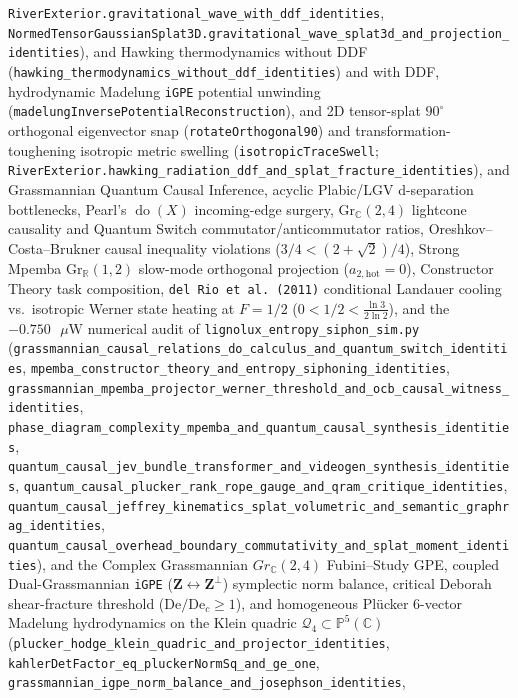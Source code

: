 \texttt{RiverExterior.gravitational\_wave\_with\_ddf\_identities},
\texttt{NormedTensorGaussianSplat3D.gravitational\_wave\_splat3d\_and\_projection\_identities}),
and Hawking thermodynamics without DDF (\texttt{hawking\_thermodynamics\_without\_ddf\_identities})
and with DDF, hydrodynamic Madelung \texttt{iGPE} potential unwinding
(\texttt{madelungInversePotentialReconstruction}), and 2D tensor-splat $90^\circ$
orthogonal eigenvector snap (\texttt{rotateOrthogonal90}) and transformation-toughening
isotropic metric swelling (\texttt{isotropicTraceSwell};
\texttt{RiverExterior.hawking\_radiation\_ddf\_and\_splat\_fracture\_identities}),
and Grassmannian Quantum Causal Inference, acyclic Plabic/LGV d-separation
bottlenecks, Pearl's $\operatorname{do}(X)$ incoming-edge surgery,
$\mathrm{Gr}_{\mathbb{C}}(2,4)$ lightcone causality and Quantum Switch
commutator/anticommutator ratios, Oreshkov--Costa--Brukner causal inequality
violations ($3/4 < (2+\sqrt{2})/4$), Strong Mpemba $\mathrm{Gr}_{\mathbb{R}}(1,2)$
slow-mode orthogonal projection ($a_{2,\mathrm{hot}}=0$), Constructor Theory
task composition, \texttt{del Rio et al.\ (2011)} conditional Landauer cooling vs.\
isotropic Werner state heating at $F=1/2$ ($0 < 1/2 < \frac{\ln 3}{2\ln 2}$), and the
$-0.750\text{ }\mu\text{W}$ numerical audit of \texttt{lignolux\_entropy\_siphon\_sim.py}
(\texttt{grassmannian\_causal\_relations\_do\_calculus\_and\_quantum\_switch\_identities},
\texttt{mpemba\_constructor\_theory\_and\_entropy\_siphoning\_identities},
\texttt{grassmannian\_mpemba\_projector\_werner\_threshold\_and\_ocb\_causal\_witness\_identities},
\texttt{phase\_diagram\_complexity\_mpemba\_and\_quantum\_causal\_synthesis\_identities},
\texttt{quantum\_causal\_jev\_bundle\_transformer\_and\_videogen\_synthesis\_identities},
\texttt{quantum\_causal\_plucker\_rank\_rope\_gauge\_and\_qram\_critique\_identities},
\texttt{quantum\_causal\_jeffrey\_kinematics\_splat\_volumetric\_and\_semantic\_graphrag\_identities},
\texttt{quantum\_causal\_overhead\_boundary\_commutativity\_and\_splat\_moment\_identities}),
and the Complex Grassmannian $Gr_{\mathbb C}(2,4)$ Fubini--Study GPE, coupled
Dual-Grassmannian \texttt{iGPE} ($\mathbf Z \leftrightarrow \mathbf Z^\perp$)
symplectic norm balance, critical Deborah shear-fracture threshold
($\mathrm{De}/\mathrm{De}_c \ge 1$), and homogeneous Plücker 6-vector Madelung
hydrodynamics on the Klein quadric $\mathcal Q_4 \subset \mathbb P^5(\mathbb C)$
(\texttt{plucker\_hodge\_klein\_quadric\_and\_projector\_identities},
\texttt{kahlerDetFactor\_eq\_pluckerNormSq\_and\_ge\_one},
\texttt{grassmannian\_igpe\_norm\_balance\_and\_josephson\_identities},
